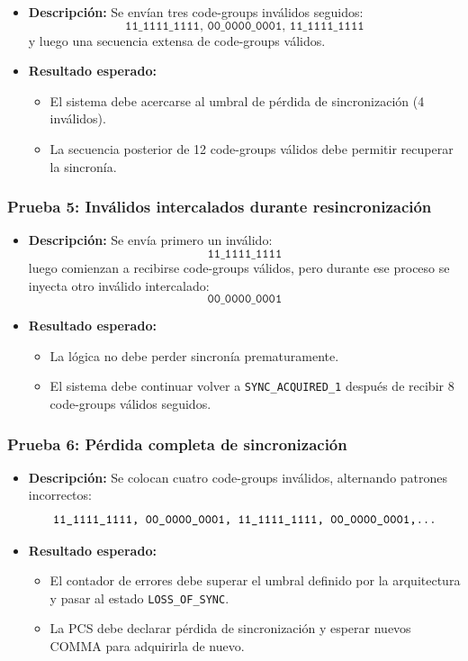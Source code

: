 \begin{itemize}
  \item \textbf{Descripción:}  
    Se envían tres code-groups inválidos seguidos:
    \[
      \texttt{11\_1111\_1111,\ 00\_0000\_0001,\ 11\_1111\_1111}
    \]
    y luego una secuencia extensa de code-groups válidos.
  \item \textbf{Resultado esperado:}
    \begin{itemize}
      \item El sistema debe acercarse al umbral de pérdida de sincronización (4 inválidos).
      \item La secuencia posterior de 12 code-groups válidos debe permitir recuperar la sincronía.
    \end{itemize}
\end{itemize}

\subsubsection*{Prueba 5: Inválidos intercalados durante resincronización}

\begin{itemize}
  \item \textbf{Descripción:}  
    Se envía primero un inválido:
    \[
      \texttt{11\_1111\_1111}
    \]
    luego comienzan a recibirse code-groups válidos, pero durante ese proceso se inyecta otro inválido intercalado:
    \[
      \texttt{00\_0000\_0001}
    \]
  \item \textbf{Resultado esperado:}
    \begin{itemize}
      \item La lógica no debe perder sincronía prematuramente.
      \item El sistema debe continuar volver a \texttt{SYNC\_ACQUIRED\_1} después de recibir 8 code-groups válidos seguidos.
    \end{itemize}
\end{itemize}

\subsubsection*{Prueba 6: Pérdida completa de sincronización}

\begin{itemize}
  \item \textbf{Descripción:}  
    Se colocan cuatro code-groups inválidos, alternando patrones incorrectos:
    \[
      \texttt{11\_1111\_1111,\ 00\_0000\_0001,\ 11\_1111\_1111,\ 00\_0000\_0001,\dots}
    \]
  \item \textbf{Resultado esperado:}
    \begin{itemize}
      \item El contador de errores debe superar el umbral definido por la arquitectura y pasar al estado \texttt{LOSS\_OF\_SYNC}.
      \item La PCS debe declarar pérdida de sincronización y esperar nuevos COMMA para adquirirla de nuevo.
    \end{itemize}
\end{itemize}

